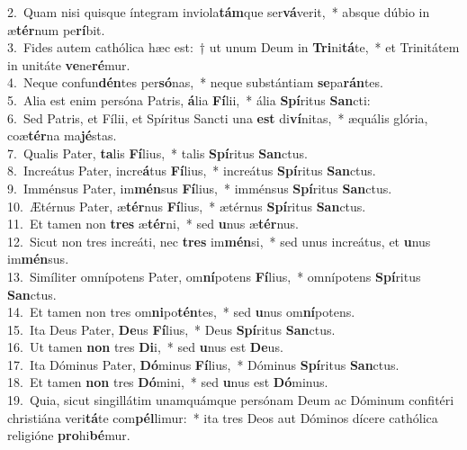 {2.~}Quam nisi quisque íntegram inviola\textbf{tám}que ser\textbf{vá}verit,~* absque dúbio in æ\textbf{tér}num pe\textbf{rí}bit.\\
{3.~}Fides autem cathólica hæc est:~† ut unum Deum in \textbf{Tri}ni\textbf{tá}te,~* et Trinitátem in unitáte \textbf{ve}ne\textbf{ré}mur.\\
{4.~}Neque confun\textbf{dén}tes per\textbf{só}nas,~* neque substántiam \textbf{se}pa\textbf{rán}tes.\\
{5.~}Alia est enim persóna Patris, \textbf{á}lia \textbf{Fí}lii,~* ália \textbf{Spí}ritus \textbf{San}cti:\\
{6.~}Sed Patris, et Fílii, et Spíritus Sancti una \textbf{est} di\textbf{ví}nitas,~* æquális glória, coæ\textbf{tér}na ma\textbf{jé}stas.\\
{7.~}Qualis Pater, \textbf{ta}lis \textbf{Fí}lius,~* talis \textbf{Spí}ritus \textbf{San}ctus.\\
{8.~}Increátus Pater, incre\textbf{á}tus \textbf{Fí}lius,~* increátus \textbf{Spí}ritus \textbf{San}ctus.\\
{9.~}Imménsus Pater, im\textbf{mén}sus \textbf{Fí}lius,~* imménsus \textbf{Spí}ritus \textbf{San}ctus.\\
{10.~}Ætérnus Pater, æ\textbf{tér}nus \textbf{Fí}lius,~* ætérnus \textbf{Spí}ritus \textbf{San}ctus.\\
{11.~}Et tamen non \textbf{tres} æ\textbf{tér}ni,~* sed \textbf{u}nus æ\textbf{tér}nus.\\
{12.~}Sicut non tres increáti, nec \textbf{tres} im\textbf{mén}si,~* sed unus increátus, et \textbf{u}nus im\textbf{mén}sus.\\
{13.~}Simíliter omnípotens Pater, om\textbf{ní}potens \textbf{Fí}lius,~* omnípotens \textbf{Spí}ritus \textbf{San}ctus.\\
{14.~}Et tamen non tres om\textbf{ni}po\textbf{tén}tes,~* sed \textbf{u}nus om\textbf{ní}potens.\\
{15.~}Ita Deus Pater, \textbf{De}us \textbf{Fí}lius,~* Deus \textbf{Spí}ritus \textbf{San}ctus.\\
{16.~}Ut tamen \textbf{non} tres \textbf{Di}i,~* sed \textbf{u}nus est \textbf{De}us.\\
{17.~}Ita Dóminus Pater, \textbf{Dó}minus \textbf{Fí}lius,~* Dóminus \textbf{Spí}ritus \textbf{San}ctus.\\
{18.~}Et tamen \textbf{non} tres \textbf{Dó}mini,~* sed \textbf{u}nus est \textbf{Dó}minus.\\
{19.~}Quia, sicut singillátim unamquámque persónam Deum ac Dóminum confitéri christiána veri\textbf{tá}te com\textbf{pél}limur:~* ita tres Deos aut Dóminos dícere cathólica religióne \textbf{pro}hi\textbf{bé}mur.\\
